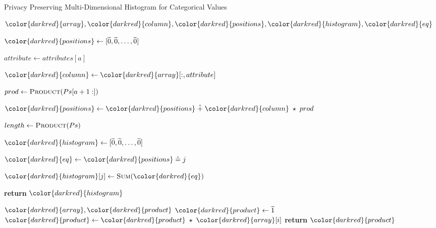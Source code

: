 \begin{algorithm}[H]
\caption{Privacy Preserving Multi-Dimensional Histogram for Categorical Values}\label{a:multidim-histogram-categorical}
\begin{algorithmic}[1]
\renewcommand{\algorithmicrequire}{\textbf{Private Vars:}}
\Require ${\color{darkred}{array}}, {\color{darkred}{column}}, {\color{darkred}{positions}}, {\color{darkred}{histogram}}, {\color{darkred}{eq}}$


    \State
    ${\color{darkred}{positions}} \gets [\enc{0}, \enc{0}, \dots, \enc{0}] $
    

      \State $attribute \gets attributes[a]$

      \State ${\color{darkred}{column}} \gets {\color{darkred}{array}}[:, attribute]$

      \State $prod \gets \textsc{Product}(Ps[a+1:])$

      \State ${\color{darkred}{positions}} \gets {\color{darkred}{positions}} \hplus {\color{darkred}{column}} \hmul prod$

    \EndFor

    \State $length \gets \textsc{Product}(Ps)$

    \State ${\color{darkred}{histogram}} \gets [\enc{0}, \enc{0}, \dots, \enc{0}]$
    


      \State ${\color{darkred}{eq}} \gets {\color{darkred}{positions}} \heq j$

      \State ${\color{darkred}{histogram}}[j] \gets \textsc{Sum}({\color{darkred}{eq}})$

    \EndFor

    \State \textbf{return} {${\color{darkred}{histogram}}$}
\EndProcedure

\begin{spacing}{0.5}
\end{spacing}

\Require ${\color{darkred}{array}}, {\color{darkred}{product}}$
    \State ${\color{darkred}{product}} \gets \enc{1}$
        \State ${\color{darkred}{product}} \gets {\color{darkred}{product}} \hmul {\color{darkred}{array}}[i]$
    \EndFor
    \State \textbf{return} {${\color{darkred}{product}}$}
\EndProcedure

\end{algorithmic}
\end{algorithm}

